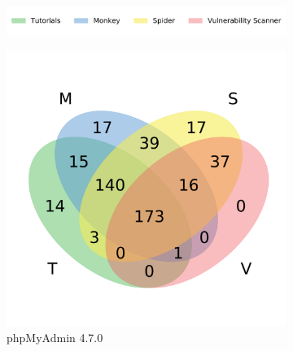 \begin{figure}[t]
  \centering
  \begin{subfigure}[b]{0.7\textwidth}
      \includegraphics[width=\textwidth]{figures/lim/venn_legend.pdf}
      \vspace{-5ex}
  \end{subfigure}

    \begin{subfigure}[b]{0.24\textwidth}
        \includegraphics[width=\textwidth]{figures/lim/venn_pma.pdf}
        \caption{\scriptsize phpMyAdmin 4.7.0}
        \label{fig:venn_pma}
    \end{subfigure}
    \begin{subfigure}[b]{0.24\textwidth}

\end{subfigure}
\end{figure}
